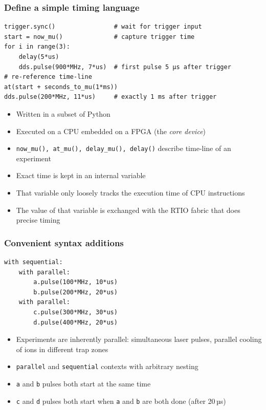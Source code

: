 \documentclass[final,presentation,compress]{beamer}
\begin{document}
\begin{frame}[fragile]
  \frametitle{Define a simple timing language}
  \footnotesize

  \begin{verbatim}
trigger.sync()                # wait for trigger input
start = now_mu()              # capture trigger time
for i in range(3):
    delay(5*us)
    dds.pulse(900*MHz, 7*us)  # first pulse 5 µs after trigger
# re-reference time-line
at(start + seconds_to_mu(1*ms))
dds.pulse(200*MHz, 11*us)     # exactly 1 ms after trigger
  \end{verbatim}

  \begin{itemize}
    \item Written in a subset of Python
    \item Executed on a CPU embedded on a FPGA (the \emph{core device})
    \item \verb!now_mu(), at_mu(), delay_mu(), delay()! describe time-line of an experiment
    \item Exact time is kept in an internal variable
    \item That variable only loosely tracks the execution time of CPU instructions
    \item The value of that variable is exchanged with the RTIO fabric that
      does precise timing
  \end{itemize}
\end{frame}


\begin{frame}[fragile]
  \frametitle{Convenient syntax additions}
  \footnotesize
  \begin{verbatim}
with sequential:
    with parallel:
        a.pulse(100*MHz, 10*us)
        b.pulse(200*MHz, 20*us)
    with parallel:
        c.pulse(300*MHz, 30*us)
        d.pulse(400*MHz, 20*us)
  \end{verbatim}

  \begin{itemize}
    \item Experiments are inherently parallel:
        simultaneous laser pulses, parallel cooling of ions in different trap zones
    \item \verb!parallel! and \verb!sequential! contexts with arbitrary nesting
    \item \verb!a! and \verb!b! pulses both start at the same time
    \item \verb!c! and \verb!d! pulses both start when \verb!a! and \verb!b! are both done
      (after 20\,µs)
  \end{itemize}
\end{frame}
\end{document}
